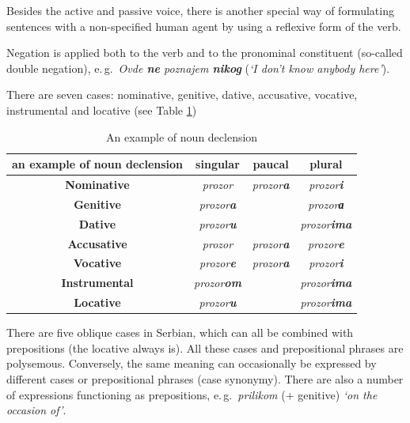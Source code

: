 \begin{multicols}{2}
Besides the active and passive voice, there is another special way of formulating sentences with a non-specified human agent by using a reflexive form of the verb. 

Negation is applied both to the verb and to the pronominal constituent (so-called double negation), e.\,g.~\textit{Ovde \textbf{ne} poznajem \textbf{nikog}} (\textit{‘I don’t know anybody here’}).

There are seven cases: nominative, genitive, dative, accusative, vocative, instrumental and locative (see Table \ref{declension}) 

\begin{table}[ht]
\begin{center}
\begin{tabular}{|c|c|c|c|}
\hline
{\textbf{an example of noun declension}} & {\textbf{singular}} & {\textbf{paucal}} & {\textbf{plural}} \\
\hline
{\textbf{Nominative}} & \textit{prozor} & \textit{prozor\textbf{a}} & \textit{prozor\textbf{i}} \\
\hline
{\textbf{Genitive}} & \textit{prozor\textbf{a}} & & \textit{prozor\textbf{а}} \\
\hline
{\textbf{Dative}} & \textit{prozor\textbf{u}} & & \textit{prozor\textbf{ima}} \\
\hline
{\textbf{Accusative}} & \textit{prozor} & \textit{prozor\textbf{a}} & \textit{prozor\textbf{e}} \\
\hline
{\textbf{Vocative}} & \textit{prozor\textbf{e}} & \textit{prozor\textbf{a}} & \textit{prozor\textbf{i}} \\
\hline
{\textbf{Instrumental}} & \textit{prozor\textbf{om}} & & \textit{prozor\textbf{ima}} \\
\hline
{\textbf{Locative}} & \textit{prozor\textbf{u}} & & \textit{prozor\textbf{ima}} \\
\hline
\end{tabular}
\end{center}
\caption{An example of noun declension}
\label{declension} 
\end{table}

There are five oblique cases in Serbian, which can all be combined with prepositions (the locative always is). All these cases and prepositional phrases are polysemous. Conversely, the same meaning can occasionally be expressed by different cases or prepositional phrases (case synonymy). There are also a number of expressions functioning as prepositions, e.\,g.~\textit{prilikom} (+ genitive) \textit{‘on the occasion of’}.


\end{multicols}
